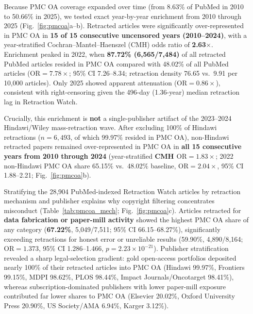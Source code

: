 \documentclass[11pt,letterpaper]{article}
\begin{document}
Because PMC OA coverage expanded over time (from 8.63\% of PubMed in 2010 to 50.66\% in 2025), we tested exact year-by-year enrichment from 2010 through 2025 (Fig.~\ref{fig:pmcoa}a--b). Retracted articles were significantly over-represented in PMC OA in \textbf{15 of 15 consecutive uncensored years (2010--2024)}, with a year-stratified Cochran--Mantel--Haenszel (CMH) odds ratio of \textbf{2.63$\times$}. Enrichment peaked in 2022, when \textbf{87.72\% (6,565/7,484)} of all retracted PubMed articles resided in PMC OA compared with 48.02\% of all PubMed articles ($\mathrm{OR}=7.78\times$; 95\% CI 7.26--8.34; retraction density 76.65 vs.\ 9.91 per 10,000 articles). Only 2025 showed apparent attenuation ($\mathrm{OR}=0.86\times$), consistent with right-censoring given the 496-day (1.36-year) median retraction lag in Retraction Watch.

Crucially, this enrichment is \textbf{not} a single-publisher artifact of the 2023--2024 Hindawi/Wiley mass-retraction wave. After excluding 100\% of Hindawi retractions ($n=6{,}493$, of which 99.97\% resided in PMC OA), non-Hindawi retracted papers remained over-represented in PMC OA in \textbf{all 15 consecutive years from 2010 through 2024} (year-stratified \textbf{CMH $\mathrm{OR}=1.83\times$}; 2022 non-Hindawi PMC OA share 65.15\% vs.\ 48.02\% baseline, $\mathrm{OR}=2.04\times$, 95\% CI 1.88--2.21; Fig.~\ref{fig:pmcoa}b).

Stratifying the 28,904 PubMed-indexed Retraction Watch articles by retraction mechanism and publisher explains why copyright filtering concentrates misconduct (Table~\ref{tab:pmcoa_mech}; Fig.~\ref{fig:pmcoa}c). Articles retracted for \textbf{data fabrication or paper-mill activity} showed the highest PMC OA share of any category (\textbf{67.22\%}, 5,049/7,511; 95\% CI 66.15--68.27\%), significantly exceeding retractions for honest error or unreliable results (59.90\%, 4,890/8,164; $\mathrm{OR}=1.373$, 95\% CI 1.286--1.466, $p=2.23\times 10^{-21}$). Publisher stratification revealed a sharp legal-selection gradient: gold open-access portfolios deposited nearly 100\% of their retracted articles into PMC OA (Hindawi 99.97\%, Frontiers 99.15\%, MDPI 98.62\%, PLOS 98.44\%, Impact Journals/Oncotarget 98.41\%), whereas subscription-dominated publishers with lower paper-mill exposure contributed far lower shares to PMC OA (Elsevier 20.02\%, Oxford University Press 20.90\%, US Society/AMA 6.94\%, Karger 3.12\%).
\end{document}
